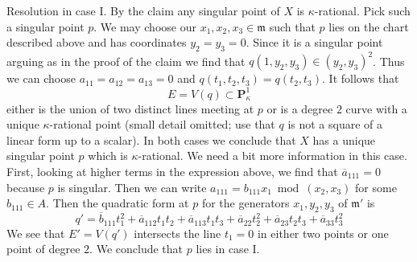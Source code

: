 \documentclass{stacks-project}
\theoremstyle{plain}
\theoremstyle{definition}
\theoremstyle{remark}
\numberwithin{equation}{subsection}
\begin{document}
\medskip\noindent
Resolution in case I. By the claim any
singular point of $X$ is $\kappa$-rational. Pick such a singular point $p$.
We may choose our $x_1, x_2, x_3 \in \mathfrak m$ such that $p$
lies on the chart described above and has coordinates $y_2 = y_3 = 0$.
Since it is a singular point arguing as in the proof of the claim
we find that $q(1, y_2, y_3) \in (y_2, y_3)^2$.
Thus we can choose $a_{11} = a_{12} = a_{13} = 0$ and
$q(t_1, t_2, t_3) = q(t_2, t_3)$. It follows that
$$
E = V(q) \subset \mathbf{P}^1_\kappa
$$
either is the union of two distinct lines meeting at $p$
or is a degree $2$ curve with a unique $\kappa$-rational point
(small detail omitted; use that $q$ is not a square of a linear
form up to a scalar).
In both cases we conclude that $X$ has a unique singular point $p$
which is $\kappa$-rational. We need a bit more information in this
case. First, looking at higher terms in the expression above, we
find that $\overline{a}_{111} = 0$ because $p$ is singular.
Then we can write $a_{111} = b_{111} x_1 \bmod (x_2, x_3)$
for some $b_{111} \in A$. Then
the quadratic form at $p$ for the generators
$x_1, y_2, y_3$ of $\mathfrak m'$ is
$$
q' =
\overline{b}_{111} t_1^2 +
\overline{a}_{112} t_1 t_2 + \overline{a}_{113} t_1 t_3 +
\overline{a}_{22} t_2^2 +
\overline{a}_{23} t_2 t_3 +
\overline{a}_{33} t_3^2
$$
We see that $E' = V(q')$ intersects the line $t_1 = 0$ in either
two points or one point of degree $2$. We conclude that $p$
lies in case I.
\end{document}
